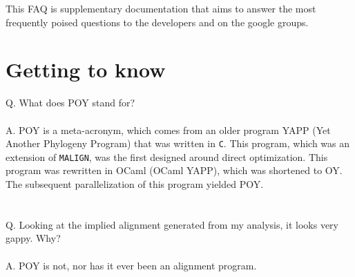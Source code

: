 This FAQ is supplementary documentation that aims to answer the most frequently poised questions to 
the \poy developers and on the \poy google groups.

\section{Getting to know \poy}
Q. What does POY  stand for?\\
\\
A. POY is a meta-acronym, which comes from an older program YAPP (Yet Another Phylogeny Program) that 
was written in \texttt{C}.  This program, which was an extension of \texttt{MALIGN}, was the first designed around direct 
optimization.  This program was rewritten in OCaml (OCaml YAPP), which was shortened to OY.  
The subsequent parallelization of this program yielded POY.\\
\\
\\
Q. Looking at the implied alignment generated from my \poy analysis, it looks very gappy.  Why?\\
\\
A. POY is not, nor has it ever been an alignment program.\\
\\
\\
